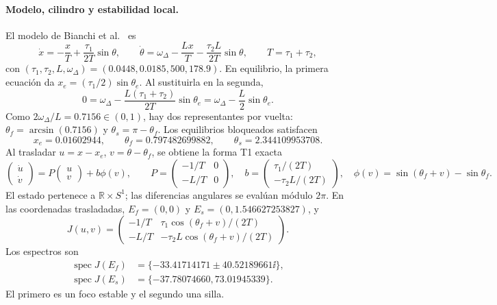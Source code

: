 \paragraph{Modelo, cilindro y estabilidad local.}
El modelo de Bianchi et al.~\cite{pll2015} es
\begin{equation}
 \dot x=-\frac{x}{T}+\frac{\tau_1}{2T}\sin\theta,
 \qquad
 \dot\theta=\omega_\Delta-\frac{Lx}{T}
 -\frac{\tau_2L}{2T}\sin\theta,
 \qquad T=\tau_1+\tau_2,
 \label{ncbench:eq:pll-original}
\end{equation}
con \((\tau_1,\tau_2,L,\omega_\Delta)=(0.0448,0.0185,500,178.9)\).
En equilibrio, la primera ecuación da
\(x_e=(\tau_1/2)\sin\theta_e\). Al sustituirla en la segunda,
\[
 0=\omega_\Delta-\frac{L(\tau_1+\tau_2)}{2T}\sin\theta_e
   =\omega_\Delta-\frac L2\sin\theta_e.
\]
Como \(2\omega_\Delta/L=0.7156\in(0,1)\), hay dos representantes por
vuelta: \(\theta_f=\arcsin(0.7156)\) y
\(\theta_s=\pi-\theta_f\). Los equilibrios bloqueados satisfacen
\begin{equation}
 x_e=0.01602944,\qquad
 \theta_f=0.797482699882,\qquad
 \theta_s=2.344109953708.
 \label{ncbench:eq:pll-equilibria}
\end{equation}
Al trasladar \(u=x-x_e\), \(v=\theta-\theta_f\), se obtiene la forma T1
exacta
\begin{equation}
 \begin{pmatrix}\dot u\\\dot v\end{pmatrix}
 =P\begin{pmatrix}u\\v\end{pmatrix}+b\phi(v),\qquad
 P=\begin{pmatrix}-1/T&0\\-L/T&0\end{pmatrix},\quad
 b=\begin{pmatrix}\tau_1/(2T)\\-\tau_2L/(2T)\end{pmatrix},
 \quad \phi(v)=\sin(\theta_f+v)-\sin\theta_f.
 \label{ncbench:eq:pll-lure}
\end{equation}
El estado pertenece a \(\mathbb R\times S^1\); las diferencias angulares se
evalúan módulo \(2\pi\). En las coordenadas trasladadas,
\(E_f=(0,0)\) y \(E_s=(0,1.546627253827)\), y
\begin{equation}
 J(u,v)=\begin{pmatrix}
 -1/T&\tau_1\cos(\theta_f+v)/(2T)\\
 -L/T&-\tau_2L\cos(\theta_f+v)/(2T)
 \end{pmatrix}.
 \label{ncbench:eq:pll-jacobian}
\end{equation}
Los espectros son
\begin{align}
 \operatorname{spec}J(E_f)&=
 \{-33.41714171\pm40.52189661\ii\},\\
 \operatorname{spec}J(E_s)&=\{-37.78074660,73.01945339\}.
\end{align}
El primero es un foco estable y el segundo una silla.

